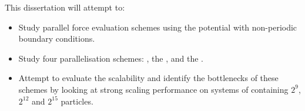 %
This dissertation will attempt to:
\begin{itemize}
\item
    Study parallel force evaluation schemes using
    the \twobody{} \LennardJones{} potential with
    non-periodic boundary conditions.

\item
    Study four parallelisation schemes:
    \replicateddata{}, the \systolicloop{},
    \sharedandreplicateddata{} and the \replicatedsystolicloop{}.

\item
    Attempt to evaluate the scalability and
    identify the bottlenecks of these schemes
    by looking at strong scaling performance
    on systems of containing
    $2^{9}$, $2^{12}$ and $2^{15}$ particles.
\end  {itemize}
